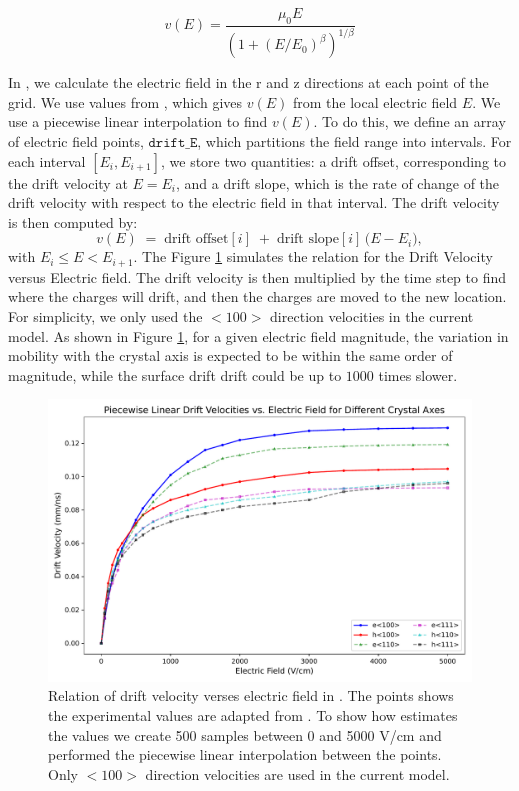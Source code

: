 \begin{equation}
v(E) = \frac{\mu_0 E}{(1 + (E/E_0)^\beta)^{1/\beta}}
\end{equation}

In {\ehd}, we calculate the electric field in the r and z directions at each point of the grid. We use values from \cite{OMAR19871351}, which gives $v(E)$ from the local electric field $E$. We use a piecewise linear interpolation to find $v(E)$. To do this, we define an array of electric field points, $\texttt{drift\_E}$, which partitions the field range into intervals. For each interval $[E_i, E_{i+1}]$, we store two quantities: a drift offset, corresponding to the drift velocity at $E = E_i$, and a drift slope, which is the rate of change of the drift velocity with respect to the electric field in that interval. The drift velocity is then
computed by:
\[
v(E) \;=\; \text{drift offset}[i]
\;+\; \text{drift slope}[i] \,\bigl( E - E_i \bigr),
\]
with $E_i \le E < E_{i+1}$. The Figure \ref{ch3_fig_dv_vs_e} simulates the relation for the Drift Velocity versus Electric field. The drift velocity is then multiplied by the time step to find where the charges will drift, and then the charges are moved to the new location. For simplicity, we only used the $<100>$ direction velocities in the current model. As shown in Figure \ref{ch3_fig_dv_vs_e}, for a given electric field magnitude, the variation in mobility with the crystal axis is expected to be within the same order of magnitude, while the surface drift drift could be up to $1000$ times slower.

\begin{figure}[!htb]
    \includegraphics[trim={0cm 0 0cm 0},clip,width=0.99\linewidth]{ch3/figs/ehd_dv_e.pdf}
    \caption{Relation of drift velocity verses electric field in {\ehd}. The points shows the experimental values are adapted from \cite{OMAR19871351}. To show how {\ehd} estimates the values we create 500 samples between 0 and 5000 V/cm and performed the piecewise linear interpolation between the points. Only $<100>$ direction velocities are used in the current model.}
    \label{ch3_fig_dv_vs_e}
\end{figure}

